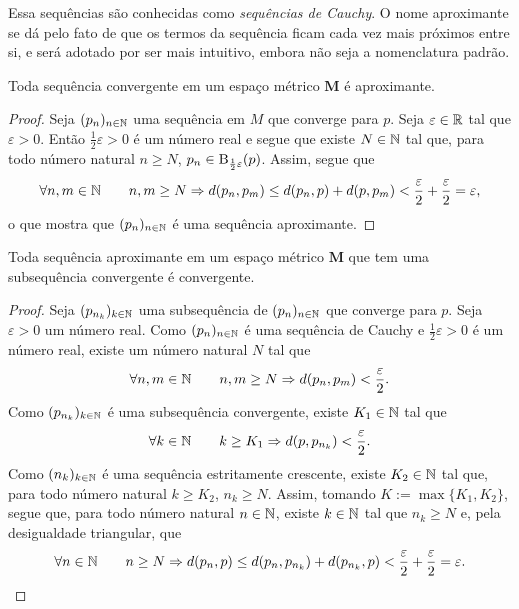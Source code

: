 Essa sequências são conhecidas como \emph{sequências de Cauchy}. O nome aproximante se dá pelo fato de que os termos da sequência ficam cada vez mais próximos entre si, e será adotado por ser mais intuitivo, embora não seja a nomenclatura padrão.

\begin{prop}
Toda sequência convergente em um espaço métrico $\bm M$ é aproximante.
\end{prop}
\begin{proof}
Seja $(p_n)_{n \in \mathbb{N}}$ uma sequência em $M$ que converge para $p$. Seja $\varepsilon \in \mathbb{R}$ tal que $\varepsilon > 0$. Então $\frac{1}{2}\varepsilon > 0$ é um número real e segue que existe $N \in \mathbb{N}$ tal que, para todo número natural $n \geq N$, $p_n \in \mathrm{B}_{\frac{1}{2}\varepsilon}(p)$. Assim, segue que	
	\begin{equation*}
	\forall n,m \in \mathbb{N} \qquad n,m \geq N \Rightarrow d(p_n,p_m) \leq d(p_n,p) + d(p,p_m) < \frac{\varepsilon}{2} + \frac{\varepsilon}{2} = \varepsilon,
	\end{equation*}
o que mostra que $(p_n)_{n \in \mathbb{N}}$ é uma sequência aproximante.
\end{proof}

\begin{prop}
Toda sequência aproximante em um espaço métrico $\bm M$ que tem uma subsequência convergente é convergente.
\end{prop}
\begin{proof}
	Seja $(p_{n_k})_{k \in \mathbb{N}}$ uma subsequência de $(p_n)_{n \in \mathbb{N}}$ que converge  para $p$. Seja $\varepsilon > 0$ um número real. Como $(p_n)_{n \in \mathbb{N}}$ é uma sequência de Cauchy e $\frac{1}{2}\varepsilon > 0$ é um número real, existe um número natural $N$ tal que
	\begin{equation*}
	\forall n,m \in \mathbb{N} \qquad n,m \geq N \Rightarrow d(p_n,p_m) < \frac{\varepsilon}{2}.
	\end{equation*}
Como $(p_{n_k})_{k \in \mathbb{N}}$ é uma subsequência convergente, existe $K_1 \in \mathbb{N}$ tal que
	\begin{equation*}
	\forall k \in \mathbb{N} \qquad k \geq K_1 \Rightarrow d(p,p_{n_k}) < \frac{\varepsilon}{2}.
	\end{equation*}
Como $(n_k)_{k \in \mathbb{N}}$ é uma sequência estritamente crescente, existe $K_2 \in \mathbb{N}$ tal que, para todo número natural $k \geq K_2$, $n_k \geq N$. Assim, tomando $K := \max\{K_1,K_2\}$, segue que, para todo número natural $n \in \mathbb{N}$, existe $k \in \mathbb{N}$ tal que $n_k \geq N$ e,  pela desigualdade triangular, que
	\begin{equation*}
	\forall n \in \mathbb{N} \qquad n \geq N \Rightarrow d(p_n,p) \leq d(p_n,p_{n_k}) + d(p_{n_k},p) < \frac{\varepsilon}{2}+\frac{\varepsilon}{2}=\varepsilon.
	\end{equation*}
\end{proof}

